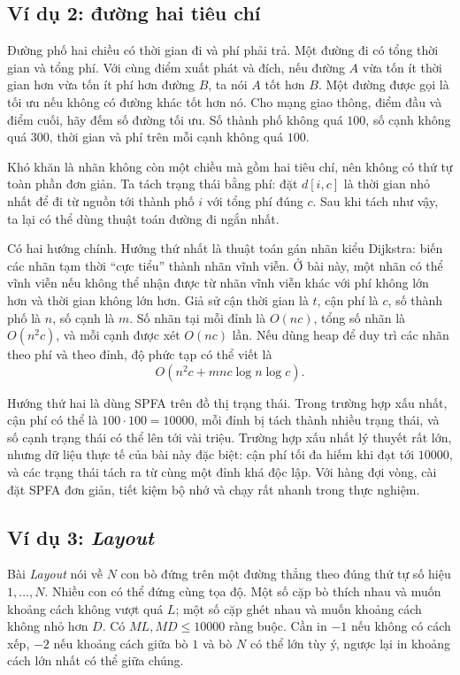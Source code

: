 \documentclass[11pt]{article}
\begin{document}
\subsection{Ví dụ 2: đường hai tiêu chí}

Đường phố hai chiều có thời gian đi và phí phải trả. Một đường đi có tổng thời
gian và tổng phí. Với cùng điểm xuất phát và đích, nếu đường \(A\) vừa tốn ít
thời gian hơn vừa tốn ít phí hơn đường \(B\), ta nói \(A\) tốt hơn \(B\). Một
đường được gọi là tối ưu nếu không có đường khác tốt hơn nó. Cho mạng giao
thông, điểm đầu và điểm cuối, hãy đếm số đường tối ưu. Số thành phố không quá
\(100\), số cạnh không quá \(300\), thời gian và phí trên mỗi cạnh không quá
\(100\).

Khó khăn là nhãn không còn một chiều mà gồm hai tiêu chí, nên không có thứ tự
toàn phần đơn giản. Ta tách trạng thái bằng phí: đặt \(d[i,c]\) là thời gian
nhỏ nhất để đi từ nguồn tới thành phố \(i\) với tổng phí đúng \(c\). Sau khi
tách như vậy, ta lại có thể dùng thuật toán đường đi ngắn nhất.

Có hai hướng chính. Hướng thứ nhất là thuật toán gán nhãn kiểu Dijkstra: biến
các nhãn tạm thời ``cực tiểu'' thành nhãn vĩnh viễn. Ở bài này, một nhãn có
thể vĩnh viễn nếu không thể nhận được từ nhãn vĩnh viễn khác với phí không lớn
hơn và thời gian không lớn hơn. Giả sử cận thời gian là \(t\), cận phí là
\(c\), số thành phố là \(n\), số cạnh là \(m\). Số nhãn tại mỗi đỉnh là
\(O(nc)\), tổng số nhãn là \(O(n^2c)\), và mỗi cạnh được xét \(O(nc)\) lần.
Nếu dùng heap để duy trì các nhãn theo phí và theo đỉnh, độ phức tạp có thể
viết là
\[
  O(n^2c+mn c\log n\log c).
\]

Hướng thứ hai là dùng SPFA trên đồ thị trạng thái. Trong trường hợp xấu nhất,
cận phí có thể là \(100\cdot 100=10000\), mỗi đỉnh bị tách thành nhiều trạng
thái, và số cạnh trạng thái có thể lên tới vài triệu. Trường hợp xấu nhất lý
thuyết rất lớn, nhưng dữ liệu thực tế của bài này đặc biệt: cận phí tối đa
hiếm khi đạt tới \(10000\), và các trạng thái tách ra từ cùng một đỉnh khá độc
lập. Với hàng đợi vòng, cài đặt SPFA đơn giản, tiết kiệm bộ nhớ và chạy rất
nhanh trong thực nghiệm.

\subsection{Ví dụ 3: \textit{Layout}}

Bài \textit{Layout} nói về \(N\) con bò đứng trên một đường thẳng theo đúng
thứ tự số hiệu \(1,\ldots,N\). Nhiều con có thể đứng cùng tọa độ. Một số cặp
bò thích nhau và muốn khoảng cách không vượt quá \(L\); một số cặp ghét nhau
và muốn khoảng cách không nhỏ hơn \(D\). Có \(ML,MD\le 10000\) ràng buộc. Cần
in \(-1\) nếu không có cách xếp, \(-2\) nếu khoảng cách giữa bò \(1\) và bò
\(N\) có thể lớn tùy ý, ngược lại in khoảng cách lớn nhất có thể giữa chúng.
\end{document}

